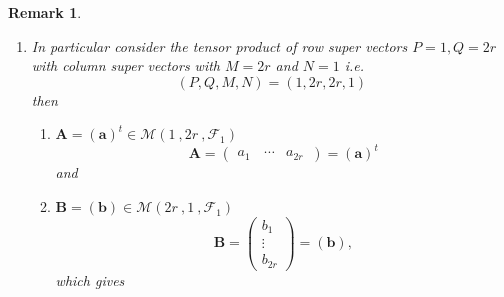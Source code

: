 \documentclass[aps,preprint]{revtex4}
\newtheorem{remark}[theorem]{Remark}
\begin{document}
\begin{remark}
\begin{enumerate}
\item In particular consider the tensor product of row super vectors $%
P=1,Q=2r$ with column super vectors with $M=2r$ and $N=1$ i.e. 
\begin{equation}
\left( P,Q,M,N\right) =\left( 1,2r,2r,1\right)
\end{equation}%
then

\begin{enumerate}
\item $\boldsymbol{A}=\left( \boldsymbol{a}\right) ^{t}\in \mathcal{M}\left(
1\ ,2r\ ,\mathcal{F}_{1}\right) $ 
\begin{equation}
\boldsymbol{A}=\left( 
\begin{array}{ccc}
a_{1\ } & \cdots & a_{2r\ }%
\end{array}%
\right) =\left( \boldsymbol{a}\right) ^{t}
\end{equation}%
and

\item $\boldsymbol{B}=\left( \boldsymbol{b}\right) \in \mathcal{M}\left( 2r\
,1\ ,\mathcal{F}_{1}\right) $ 
\begin{equation}
\boldsymbol{B}=\left( 
\begin{array}{c}
b_{1} \\ 
\vdots \\ 
b_{2r}%
\end{array}%
\right) =\left( \boldsymbol{b}\right) ,
\end{equation}%
which gives


\end{enumerate}
\end{enumerate}
\end{remark}
\end{document}
